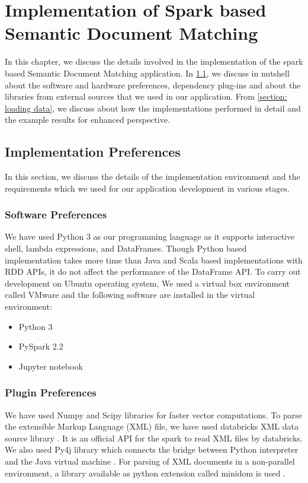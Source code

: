 \chapter{Implementation of Spark based Semantic Document Matching}
\label{implementation}

In this chapter, we discuss the details involved in the implementation of the spark based Semantic Document Matching application. In \ref{section: implementation preferences}, we discuss in nutshell about the software and hardware preferences, dependency plug-ins and about the libraries from external sources that we used in our application. From \ref{section: loading data}, we discuss about how the implementations performed in detail and the example results for enhanced perspective.


\section{Implementation Preferences}
\label{section: implementation preferences}
In this section, we discuss the details of the implementation environment and the requirements which we used for our application development in various stages.

\subsection{Software Preferences}
We have used Python 3 as our programming language as it supports interactive shell, lambda expressions, and DataFrames. Though Python based implementation takes more time than Java and Scala based implementations with RDD APIs, it do not affect the performance of the DataFrame API. To carry out development on Ubuntu operating system, We used a virtual box environment called VMware and the following software are installed in the virtual environment:

\begin{itemize}
\item Python 3
\item PySpark 2.2
\item Jupyter notebook
\end{itemize}




\subsection{Plugin Preferences}
We have used Numpy and Scipy libraries \cite{website:numpy} for faster vector computations. To parse the extensible Markup Language (XML) file, we have used databricks XML data source library \cite{website:xmlspark}. It is an official API for the spark to read XML files by databricks. We also used Py4j library which connects the bridge between Python interpreter and the Java virtual machine \cite{website:py4j}. For parsing of XML documents in a non-parallel environment, a library available as python extension called minidom is used \cite{website:minidom}.


